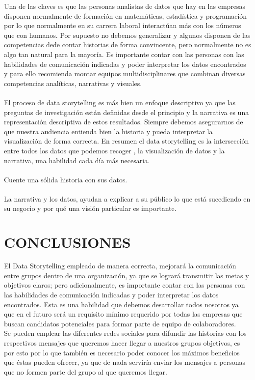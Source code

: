 \documentclass[preprint,12pt]{elsarticle}
\begin{document}
	Una de las claves es que las personas analistas de datos que hay en las empresas disponen normalmente de formación en matemáticas, estadística y programación por lo que normalmente en su carrera laboral  interactúan más con los números que con humanos. Por supuesto no debemos generalizar y algunos disponen de las competencias dede contar historias de forma convincente, pero normalmente no es algo tan natural para la mayoría. Es importante contar con las personas con las habilidades de comunicación indicadas y poder interpretar los datos encontrados y para ello recomienda montar equipos multidisciplinares que combinan diversas competencias analíticas, narrativas y visuales.\\
	\\
	El proceso de data storytelling es más bien un enfoque descriptivo ya que las preguntas de investigación están definidas desde el principio y la narrativa es una representación descriptiva de estos resultados. Siempre debemos asegurarnos de que  nuestra audiencia entienda bien la historia y pueda interpretar la visualización de forma correcta. En resumen el data storytelling es la intersección entre todos los datos que podemos recoger , la visualización de datos y la narrativa, una habilidad cada día más necesaria. \\
	\\
	Cuente una sólida historia con sus datos.\\
	\\
	La narrativa y los datos, ayudan a explicar a su público lo que está sucediendo en su negocio y por qué una visión particular es importante.
	
	\section{CONCLUSIONES}
	
	El Data Storytelling empleado de manera correcta, mejorará la comunicación entre grupos dentro de una organización, ya que se logrará transmitir las metas y objetivos claros; pero adicionalmente, es importante contar con las personas con las habilidades de comunicación indicadas y poder interpretar los datos encontrados. Esta es una habilidad que debemos desarrollar todos nosotros ya que en el futuro será un requisito mínimo requerido por todas las empresas que buscan candidatos potenciales para formar parte de equipo de colaboradores.\\
	
	Se pueden emplear las diferentes redes sociales para difundir las historias con los respectivos mensajes que queremos hacer llegar a nuestros grupos objetivos, es por esto por lo que también es necesario poder conocer los máximos beneficios que éstas pueden ofrecer, ya que de nada serviría enviar los mensajes a personas que no formen parte del grupo al que queremos llegar.
	
	
	
	
	
	
\end{document}
